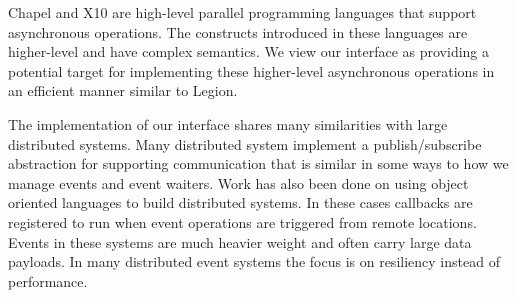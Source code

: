 Chapel\cite{Chamberlain:Chapel} and X10\cite{X1005} are high-level parallel
programming languages that support asynchronous operations.  The constructs
introduced in these languages are higher-level and have complex 
semantics.  We view our interface as providing a potential target
for implementing these higher-level asynchronous operations in an efficient
manner similar to Legion\cite{Legion12}.

The implementation of our interface shares many similarities with large
distributed systems.  Many distributed system implement a publish/subscribe
abstraction for supporting communication that is similar in some ways to how
we manage events and event waiters\cite{Aguilera99,Carzaniga01}.  Work has
also been done on using object oriented languages to build 
distributed systems\cite{Eugster01,Harrison97,Chang91}.  In these cases
callbacks are registered to run when event operations are triggered
from remote locations.  Events in these systems are much heavier weight
and often carry large data payloads.  In many distributed event systems
the focus is on resiliency instead of performance\cite{Ostrowski09}.
